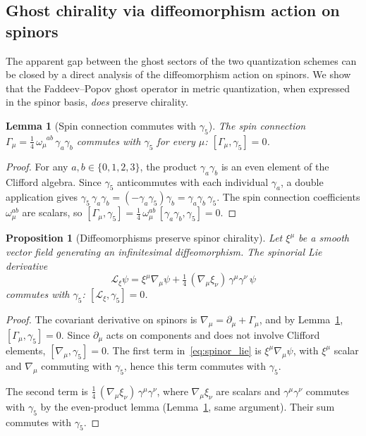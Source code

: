 \documentclass[12pt,a4paper]{article}
\newtheorem{lemma}[theorem]{Lemma}
\newtheorem{proposition}[theorem]{Proposition}
\theoremstyle{definition}
\theoremstyle{remark}
\begin{document}
\subsection{Ghost chirality via diffeomorphism action on spinors}
\label{sec:ghost_chirality}

The apparent gap between the ghost sectors of the two quantization schemes
can be closed by a direct analysis of the diffeomorphism action on spinors.
We show that the Faddeev--Popov ghost operator in metric quantization,
when expressed in the spinor basis, \emph{does} preserve chirality.

\begin{lemma}[Spin connection commutes with $\gamma_5$]
\label{lem:spin_connection_chiral}
The spin connection $\Gamma_\mu = \tfrac{1}{4}\,\omega_\mu^{\phantom{\mu}ab}\,
\gamma_a\gamma_b$ commutes with $\gamma_5$ for every $\mu$:
$[\Gamma_\mu, \gamma_5] = 0$.
\end{lemma}

\begin{proof}
For any $a, b \in \{0,1,2,3\}$, the product $\gamma_a\gamma_b$ is an even
element of the Clifford algebra.  Since $\gamma_5$ anticommutes with each
individual $\gamma_a$, a double application gives
$\gamma_5\,\gamma_a\gamma_b = (-\gamma_a\gamma_5)\gamma_b
= \gamma_a\gamma_b\,\gamma_5$.  The spin connection coefficients
$\omega_\mu^{ab}$ are scalars, so
$[\Gamma_\mu, \gamma_5] = \tfrac{1}{4}\,\omega_\mu^{ab}\,
[\gamma_a\gamma_b, \gamma_5] = 0$.
\end{proof}

\begin{proposition}[Diffeomorphisms preserve spinor chirality]
\label{prop:diffeo_chirality}
Let $\xi^\mu$ be a smooth vector field generating an infinitesimal
diffeomorphism.  The spinorial Lie derivative
\begin{equation}\label{eq:spinor_lie}
  \mathcal{L}_\xi\psi = \xi^\mu\nabla_\mu\psi
  + \tfrac{1}{4}\,(\nabla_\mu\xi_\nu)\,\gamma^\mu\gamma^\nu\,\psi
\end{equation}
commutes with $\gamma_5$: $[\mathcal{L}_\xi, \gamma_5] = 0$.
\end{proposition}

\begin{proof}
The covariant derivative on spinors is
$\nabla_\mu = \partial_\mu + \Gamma_\mu$, and by
Lemma~\ref{lem:spin_connection_chiral}, $[\Gamma_\mu, \gamma_5] = 0$.
Since $\partial_\mu$ acts on components and does not involve Clifford
elements, $[\nabla_\mu, \gamma_5] = 0$.  The first term in~\eqref{eq:spinor_lie}
is $\xi^\mu\nabla_\mu\psi$, with $\xi^\mu$ scalar and $\nabla_\mu$
commuting with $\gamma_5$, hence this term commutes with $\gamma_5$.

The second term is
$\tfrac{1}{4}\,(\nabla_\mu\xi_\nu)\,\gamma^\mu\gamma^\nu$, where
$\nabla_\mu\xi_\nu$ are scalars and $\gamma^\mu\gamma^\nu$ commutes with
$\gamma_5$ by the even-product lemma (Lemma~\ref{lem:spin_connection_chiral},
same argument).  Their sum commutes with $\gamma_5$.
\end{proof}
\end{document}
